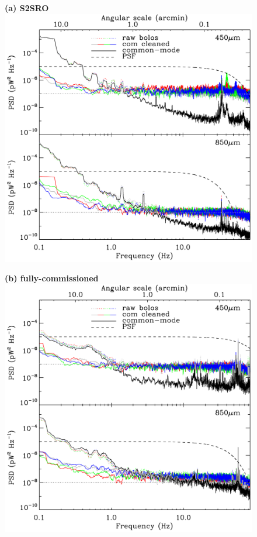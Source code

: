 \documentclass[useAMS,usenatbib,nofootinbib]{mn2e}
\begin{document}
\begin{figure}
\centering

\begin{minipage}[h]{0.495\linewidth}
\textbf{(a) S2SRO} \\

\includegraphics[width=\linewidth]{pspec_s2sro}
\end{minipage}
\begin{minipage}[h]{0.495\linewidth}
\textbf{(b) fully-commissioned} \\

\includegraphics[width=\linewidth]{pspec}
\end{minipage}


\end{figure}
\end{document}
